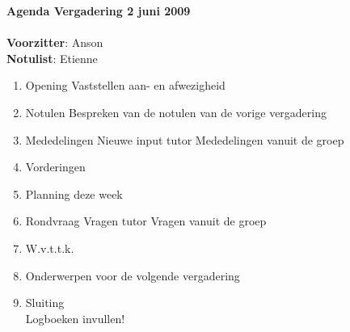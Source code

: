 \documentclass[11pt,oneside,a4paper]{article}
\begin{document}
\textbf{{\LARGE{Agenda Vergadering 2 juni 2009}}}\\ \\
\textbf{Voorzitter}: Anson\\
\textbf{Notulist}: Etienne\\

\begin{enumerate}

    \item Opening
    		\subitem Vaststellen aan- en afwezigheid
    \item Notulen
        \subitem Bespreken van de notulen van de vorige vergadering
    \item Mededelingen
			\subitem Nieuwe input tutor
			\subitem Mededelingen vanuit de groep

	 \item Vorderingen
    \item Planning deze week

    \item Rondvraag
			\subitem Vragen tutor
			\subitem Vragen vanuit de groep
	 \item W.v.t.t.k.
	 \item Onderwerpen voor de volgende vergadering
    \item Sluiting\\

    Logboeken invullen!
\end{enumerate}
\end{document}
